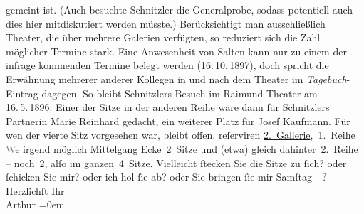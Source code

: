 \begin{ledgroupsized}[t]{13cm}
{{{                  gemeint ist. (Auch besuchte Schnitzler die Generalprobe, sodass
                  potentiell auch dies hier mitdiskutiert werden müsste.) Berücksichtigt man ausschließlich Theater, die
                  über mehrere Galerien verfügten, so reduziert sich die Zahl möglicher Termine stark. Eine Anwesenheit von
                  Salten kann nur zu einem der infrage kommenden Termine belegt werden
                  (16. 10. 1897), doch spricht die Erwähnung
                  mehrerer anderer Kollegen in und nach dem Theater im \emph{Tagebuch}-Eintrag 
                  dagegen. So bleibt Schnitzlers Besuch
                  im Raimund-Theater am 16. 5. 1896.
                  Einer der Sitze in der anderen Reihe wäre dann für Schnitzlers Partnerin Marie Reinhard
                  gedacht, ein weiterer Platz für Josef Kaufmann. 
                  Für wen der vierte Sitz vorgesehen war, bleibt offen.}}}\label{K_L03035-1h} reſerviren\pend
           \pstart
           \uline{2. Gallerie}, 1. Reihe\pend
           \pstart
           \textcolor{gray}{W}e{\geminationn} irgend möglich Mittelgang
               Ecke 2 Sitze und \introOben{}(etwa)\introOben{} gleich dahinter 2. Reihe – noch 2,
               alſo {\pb}im ganzen 4 Sitze.\pend
           \pstart
           Vielleicht ſtecken Sie die Sitze zu ſich? oder ſchicken Sie mir? oder ich hol ſie ab?
               oder Sie bringen ſie mir Samſtag –?\pend
           \pstart
           Herzlichſt Ihr {\\[\baselineskip]}\spacefill\mbox{Arthur}\pend
           \leftskip=0em{}
         
         \endnumbering{}\end{ledgroupsized}  \newcommand{\dateiname}{L03035}\newcommand{\titel}{Arthur Schnitzler an Felix Salten, [14. 5. 1896?]}\newcommand{\editorInnen}{Martin Anton Müller und Laura Untner}
      